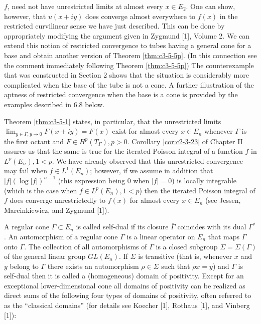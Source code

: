 $f$, need not have unrestricted limits at almost every $x \in E_2$. One can show, however, that $u(x + iy)$ does converge almost everywhere to $f(x)$ in the restricted curvilinear sense we have just described. This can be done by appropriately modifying the argument given in Zygmund [1], Volume 2. We can extend this notion of restricted convergence to tubes having a general cone for a base and obtain another version of Theorem \ref{thm:c3-5-5p}. (In this connection see the comment immediately following Theorem \ref{thm:c3-5-5p}) The counterexample that was constructed in Section 2 shows that the situation is considerably more complicated when the base of the tube is not a cone. A further illustration of the aptness of restricted convergence when the base is a cone is provided by the examples described in 6.8 below.

 Theorem \ref{thm:c3-5-1} states, in particular, that the unrestricted limits $\lim_{y\in\Gamma,y\to0}F(x+iy)=F(x)$ exist for almost every $x\in E_n$ whenever $\Gamma$ is the first octant and $F\in H^p(T_\Gamma), p>0$. Corollary \ref{cor:c2-3-23} of Chapter II assures us that the same is true for the iterated Poisson integral of a function $f$ in $L^p(E_n),1<p$. We have already observed that this unrestricted convergence may fail when $f\in L^1(E_n)$; however, if we assume in addition that $|f|(\log|f|)^{n-1}$ (this expression being 0 when $|f|=0$) is locally integrable (which is the case when $f\in L^p(E_n),1<p$) then the iterated Poisson integral of $f$ does converge unrestrictedly to $f(x)$ for almost every $x\in E_n$ (see Jessen, Marcinkiewicz, and Zygmund [1]).

 A regular cone $\Gamma \subset E_n$ is called self-dual if its closure $\overline{\Gamma}$ coincides with its dual $\Gamma^*$. An automorphism of a regular cone $\Gamma$ is a linear operator on $E_n$ that maps $\Gamma$ onto $\Gamma$. The collection of all automorphisms of $\Gamma$ is a closed subgroup $\Sigma = \Sigma(\Gamma)$ of the general linear group $GL(E_n)$. If $\Sigma$ is transitive (that is, whenever $x$ and $y$ belong to $\Gamma$ there exists an automorphism $\rho \in \Sigma$ such that $\rho x = y$) and $\Gamma$ is self-dual then it is called a (homogeneous) domain of positivity. Except for an exceptional lower-dimensional cone all domains of positivity can be realized as direct sums of the following four types of domains of positivity, often referred to as the ``classical domains'' (for details see Koecher [1], Rothaus [1], and Vinberg [1]):

